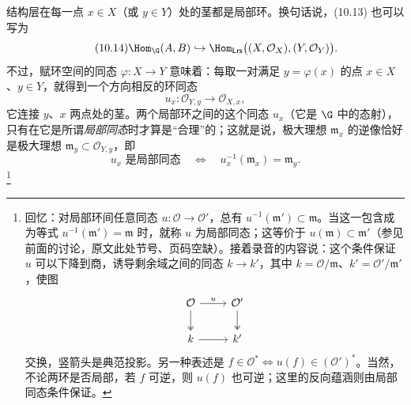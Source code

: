 结构层在每一点 $x\in X$（或 $y\in Y$）处的茎都是局部环。换句话说，(10.13) 也可以写为
\begin{equation}\tag{10.14}
 \Hom_{\G}(A,B)\hookrightarrow
 \Hom_{\mathsf{Lrs}}\bigl((X,\mathcal O_X),(Y,\mathcal O_Y)\bigr).
\end{equation}
不过，赋环空间的同态 $\varphi\colon X\to Y$ 意味着：每取一对满足 $y=\varphi(x)$ 的点 $x\in X$、$y\in Y$，就得到一个方向相反的环同态
\begin{equation}\tag{10.15}
 u_x\colon\mathcal O_{Y,y}\longrightarrow\mathcal O_{X,x},
\end{equation}
它连接 $y$、$x$ 两点处的茎。两个局部环之间的这个同态 $u_x$（它是 $\G$ 中的态射），只有在它是所谓\emph{局部同态}时才算是“合理”的；这就是说，极大理想 $\mathfrak m_x$ 的逆像恰好是极大理想 $\mathfrak m_y\subset\mathcal O_{Y,y}$，即
\begin{equation}\tag{10.16}
 u_x\text{ 是局部同态}\quad\Longleftrightarrow\quad
 u_x^{-1}(\mathfrak m_x)=\mathfrak m_y.
\end{equation}
\footnote{回忆：对局部环间任意同态 $u\colon\mathcal O\to\mathcal O'$，总有 $u^{-1}(\mathfrak m')\subset\mathfrak m$。当这一包含成为等式 $u^{-1}(\mathfrak m')=\mathfrak m$ 时，就称 $u$ 为局部同态；这等价于 $u(\mathfrak m)\subset\mathfrak m'$（参见前面的讨论，原文此处节号、页码空缺）。接着录音的内容说：这个条件保证 $u$ 可以下降到商，诱导剩余域之间的同态 $k\to k'$，其中 $k=\mathcal O/\mathfrak m$、$k'=\mathcal O'/\mathfrak m'$，使图
\[
\begin{tikzcd}[ampersand replacement=\&]
\mathcal O\arrow[r,"u"]\arrow[d,two heads]\&\mathcal O'\arrow[d,two heads]\\
k\arrow[r]\&k'
\end{tikzcd}
\]
交换，竖箭头是典范投影。另一种表述是 $f\in\mathcal O^*\Longleftrightarrow u(f)\in(\mathcal O')^*$。当然，不论两环是否局部，若 $f$ 可逆，则 $u(f)$ 也可逆；这里的反向蕴涵则由局部同态条件保证。}
\begin{center}
\end{center}
